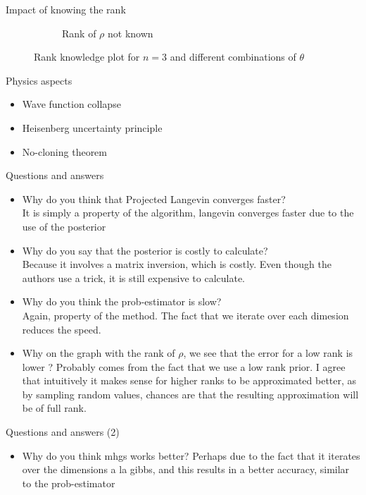 \documentclass{beamer}
\begin{document}
\begin{frame}{Impact of knowing the rank}
\begin{figure}[H]
\begin{subfigure}[b]{0.49\textwidth}
            \caption{Rank of $\rho$ not known}
    
            \label{fig:rank-no-info-var-theta-sub}
    
        \end{subfigure}
    
        \caption{Rank knowledge plot for $n=3$ and different combinations of $\theta$}
    
        \label{fig:rank-info-var-theta}
    
    \end{figure}    
\end{frame}
\begin{frame}{Physics aspects}
    \begin{itemize}
        \item Wave function collapse
        \item Heisenberg uncertainty principle
        \item No-cloning theorem
    \end{itemize}
\end{frame}
\begin{frame}{Questions and answers}
    \begin{itemize}
        \item Why do you think that Projected Langevin converges faster?\\
        It is simply a property of the algorithm, langevin converges faster due to the use of the posterior
        \item Why do you say that the posterior is costly to calculate?\\
        Because it involves a matrix inversion, which is costly. Even though the authors use a trick, it is still expensive to calculate.
        \item Why do you think the prob-estimator is slow?\\
        Again, property of the method. The fact that we iterate over each dimesion reduces the speed.
        \item Why on the graph with the rank of $\rho$, we see that the error for a low rank is lower ?
        Probably comes from the fact that we use a low rank prior. I agree that intuitively it makes sense for higher ranks to be approximated better, as by sampling random values, chances are that the resulting approximation will be of full rank.
    \end{itemize}
\end{frame}
\begin{frame}{Questions and answers (2)}
    \begin{itemize}
        \item Why do you think mhgs works better?
        Perhaps due to the fact that it iterates over the dimensions a la gibbs, and this results in a better accuracy, similar to the prob-estimator
    \end{itemize}
\end{frame}
\end{document}
